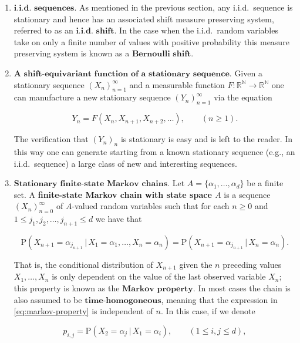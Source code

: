 \documentclass[11pt]{report}
\newcommand{\R}{\mathbb{R}}
\newcommand{\N}{\mathbb{N}}
\theoremstyle{plain}
\theoremstyle{definition}
\begin{document}
\begin{enumerate}[label=\arabic*.]
\item $\textbf{i.i.d. sequences.}$ As mentioned in the
previous section, any i.i.d.\ sequence is stationary
and hence has an associated shift measure preserving
system, referred to as an $\textbf{i.i.d. shift}$. In
the case when the i.i.d.\ random variables take on
only a finite number of values with positive
probability this measure preserving system is known as
a $\textbf{Bernoulli shift}$.

\item $\textbf{A shift-equivariant function of a stationary
sequence.}$
Given a stationary sequence $(X_n)_{n=1}^\infty$ and
a measurable function $F:\R^\N\to\R^\N$ one can
manufacture a new stationary sequence
$(Y_n)_{n=1}^\infty$ via the equation

\begin{equation*} \tag{15}\label{eq:shift-equivariant}
Y_n = F(X_n,X_{n+1},X_{n+2},\ldots), \qquad (n\ge 1).
\end{equation*}

\noindent The verification that $(Y_n)_n$ is stationary is easy
and is left to the reader. In this way one can
generate starting from a known stationary sequence
(e.g., an i.i.d.\ sequence) a large class of new and
interesting sequences.

\item $\textbf{Stationary finite-state Markov chains.}$ Let
$A=\{\alpha_1,\ldots,\alpha_d\}$ be a finite set. A
\textbf{finite-state Markov chain with state space $A$} is a
sequence $(X_n)_{n=0}^\infty$ of $A$-valued random
variables such that for each $n\ge0$ and
$1\le j_1,j_2,\ldots,j_{n+1}\le d$ we have that

\begin{equation*} \tag{16}\label{eq:markov-property}
\mathrm{P}(X_{n+1} = \alpha_{j_{n+1}}\,|\,X_1=\alpha_1,\ldots,X_n=\alpha_n)
=
\mathrm{P}(X_{n+1} = \alpha_{j_{n+1}}\,|\,X_n=\alpha_n).
\end{equation*}

\noindent That is, the conditional distribution of $X_{n+1}$
given the $n$ preceding values $X_1,\ldots,X_n$ is
only dependent on the value of the last observed
variable $X_n$; this property is known as the
$\textbf{Markov property}$. In most cases the chain
is also assumed to be $\textbf{time-homogoneous}$,
meaning that the expression in \eqref{eq:markov-property}
is independent of $n$. In this case, if we denote

\[
p_{i,j} = \mathrm{P}(X_{2} = \alpha_j\,|\,X_1=\alpha_i), \qquad (1\le i,j\le d),
\]


\end{enumerate}
\end{document}
